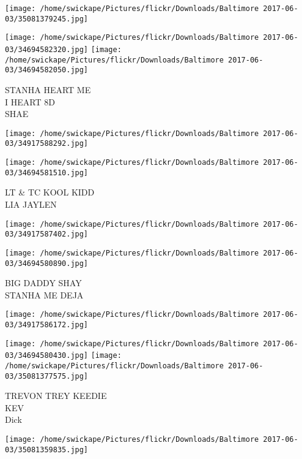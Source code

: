 \documentclass[10pt,letterpaper]{article}
\begin{document}
\texttt{[image: /home/swickape/Pictures/flickr/Downloads/Baltimore 2017-06-03/35081379245.jpg]}

\vspace{0.25in}
\texttt{[image: /home/swickape/Pictures/flickr/Downloads/Baltimore 2017-06-03/34694582320.jpg]}
\texttt{[image: /home/swickape/Pictures/flickr/Downloads/Baltimore 2017-06-03/34694582050.jpg]}

STANHA HEART ME\\
I HEART 8D\\
SHAE\\
\pagebreak

\texttt{[image: /home/swickape/Pictures/flickr/Downloads/Baltimore 2017-06-03/34917588292.jpg]}

\vspace{0.25in}
\texttt{[image: /home/swickape/Pictures/flickr/Downloads/Baltimore 2017-06-03/34694581510.jpg]}

LT \& TC KOOL KIDD\\
LIA JAYLEN\\
\pagebreak

\texttt{[image: /home/swickape/Pictures/flickr/Downloads/Baltimore 2017-06-03/34917587402.jpg]}

\vspace{0.25in}
\texttt{[image: /home/swickape/Pictures/flickr/Downloads/Baltimore 2017-06-03/34694580890.jpg]}

BIG DADDY SHAY\\
STANHA ME DEJA\\
\pagebreak

\texttt{[image: /home/swickape/Pictures/flickr/Downloads/Baltimore 2017-06-03/34917586172.jpg]}

\vspace{0.25in}
\texttt{[image: /home/swickape/Pictures/flickr/Downloads/Baltimore 2017-06-03/34694580430.jpg]}
\texttt{[image: /home/swickape/Pictures/flickr/Downloads/Baltimore 2017-06-03/35081377575.jpg]}

TREVON TREY KEEDIE\\
KEV\\
Dick\\
\pagebreak

\texttt{[image: /home/swickape/Pictures/flickr/Downloads/Baltimore 2017-06-03/35081359835.jpg]}
\end{document}
